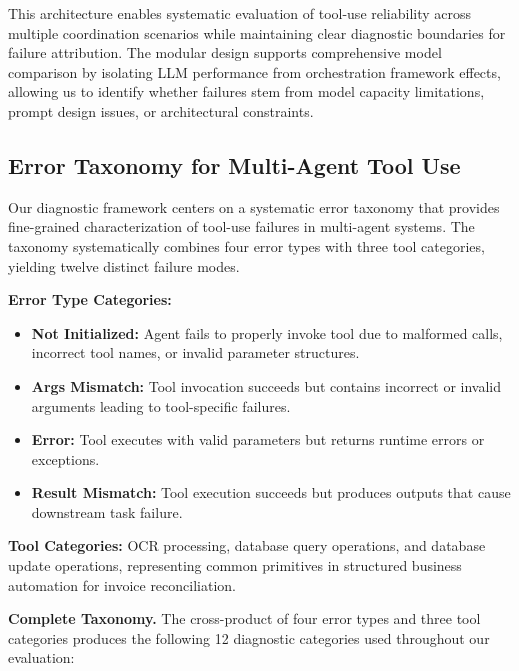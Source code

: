 \documentclass[conference]{IEEEtran}
\begin{document}
This architecture enables systematic evaluation of tool-use reliability across multiple coordination scenarios while maintaining clear diagnostic boundaries for failure attribution. The modular design supports comprehensive model comparison by isolating LLM performance from orchestration framework effects, allowing us to identify whether failures stem from model capacity limitations, prompt design issues, or architectural constraints.


\subsection{Error Taxonomy for Multi-Agent Tool Use}

Our diagnostic framework centers on a systematic error taxonomy that provides fine-grained characterization of tool-use failures in multi-agent systems. The taxonomy systematically combines four error types with three tool categories, yielding twelve distinct failure modes.

\textbf{Error Type Categories:}
\begin{itemize}
    \item \textbf{Not Initialized:} Agent fails to properly invoke tool due to malformed calls, incorrect tool names, or invalid parameter structures.
    \item \textbf{Args Mismatch:} Tool invocation succeeds but contains incorrect or invalid arguments leading to tool-specific failures.
    \item \textbf{Error:} Tool executes with valid parameters but returns runtime errors or exceptions.
    \item \textbf{Result Mismatch:} Tool execution succeeds but produces outputs that cause downstream task failure.
\end{itemize}

\textbf{Tool Categories:} OCR processing, database query operations, and database update operations, representing common primitives in structured business automation for invoice reconciliation.

\textbf{Complete Taxonomy.} The cross-product of four error types and three tool categories produces the following 12 diagnostic categories used throughout our evaluation:
\end{document}

